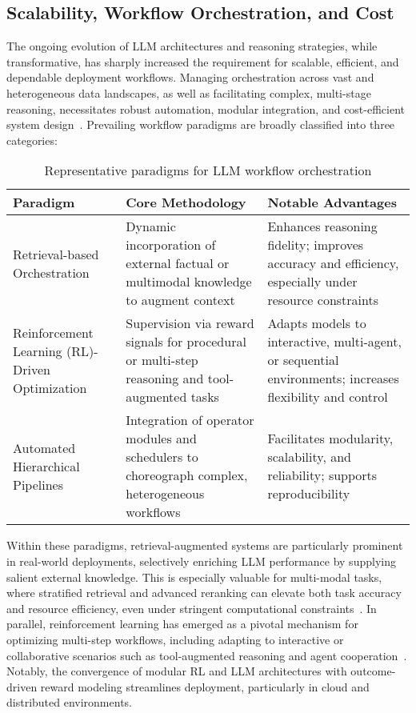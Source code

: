 \documentclass[sigconf]{acmart}
\begin{document}
\subsection{Scalability, Workflow Orchestration, and Cost}

The ongoing evolution of LLM architectures and reasoning strategies, while transformative, has sharply increased the requirement for scalable, efficient, and dependable deployment workflows. Managing orchestration across vast and heterogeneous data landscapes, as well as facilitating complex, multi-stage reasoning, necessitates robust automation, modular integration, and cost-efficient system design~\cite{ref5,ref8,ref9,ref12,ref37,ref43,ref50,ref55,ref57,ref60,ref64,ref79,ref80,ref86,ref88,ref89,ref104}. Prevailing workflow paradigms are broadly classified into three categories:

\begin{table*}[htbp]
\centering
\caption{Representative paradigms for LLM workflow orchestration}
\label{tab:workflow_paradigms}
\begin{adjustbox}{max width=\textwidth}
\begin{tabular}{lll}
\toprule
\textbf{Paradigm} & \textbf{Core Methodology} & \textbf{Notable Advantages} \\
\midrule
Retrieval-based Orchestration & Dynamic incorporation of external factual or multimodal knowledge to augment context & Enhances reasoning fidelity; improves accuracy and efficiency, especially under resource constraints~\cite{ref5,ref50,ref79,ref80} \\
Reinforcement Learning (RL)-Driven Optimization & Supervision via reward signals for procedural or multi-step reasoning and tool-augmented tasks & Adapts models to interactive, multi-agent, or sequential environments; increases flexibility and control~\cite{ref8,ref9,ref12,ref37,ref55,ref60,ref64,ref86} \\
Automated Hierarchical Pipelines & Integration of operator modules and schedulers to choreograph complex, heterogeneous workflows & Facilitates modularity, scalability, and reliability; supports reproducibility~\cite{ref12,ref64,ref86,ref79} \\
\bottomrule
\end{tabular}
\end{adjustbox}
\end{table*}

Within these paradigms, retrieval-augmented systems are particularly prominent in real-world deployments, selectively enriching LLM performance by supplying salient external knowledge. This is especially valuable for multi-modal tasks, where stratified retrieval and advanced reranking can elevate both task accuracy and resource efficiency, even under stringent computational constraints~\cite{ref79,ref80,ref89}. In parallel, reinforcement learning has emerged as a pivotal mechanism for optimizing multi-step workflows, including adapting to interactive or collaborative scenarios such as tool-augmented reasoning and agent cooperation~\cite{ref8,ref9,ref12,ref37,ref55,ref60,ref64,ref86}. Notably, the convergence of modular RL and LLM architectures with outcome-driven reward modeling streamlines deployment, particularly in cloud and distributed environments.
\end{document}
